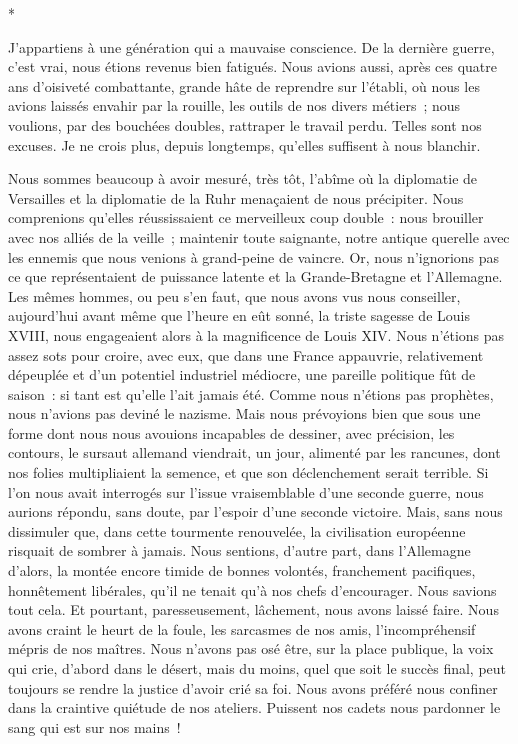\documentclass[french,twoside]{book} %
\begin{document}
\begin{center}
*\end{center}
\noindent J’appartiens à une génération qui a mauvaise conscience. De la dernière guerre, c’est vrai, nous étions revenus bien fatigués. Nous avions aussi, après ces quatre ans d’oisiveté combattante, grande hâte de reprendre sur l’établi, où nous les avions laissés envahir par la rouille, les outils de nos divers métiers ; nous voulions, par des bouchées doubles, rattraper le travail perdu. Telles sont nos excuses. Je ne crois plus, depuis longtemps, qu’elles suffisent à nous blanchir.\par
Nous sommes beaucoup à avoir mesuré, très tôt, l’abîme où la diplomatie de Versailles et la diplomatie de la Ruhr menaçaient de nous précipiter. Nous comprenions qu’elles réussissaient ce merveilleux coup double : nous brouiller avec nos alliés de la veille ; maintenir toute saignante, notre antique querelle avec les ennemis que nous venions à grand-peine de vaincre. Or, nous n’ignorions pas ce que représentaient de puissance latente et la Grande-Bretagne et l’Allemagne. Les mêmes hommes, ou peu s’en faut, que nous avons vus nous conseiller, aujourd’hui avant même que l’heure en eût sonné, la triste sagesse de Louis XVIII, nous engageaient alors à la magnificence de Louis XIV. Nous n’étions pas assez sots pour croire, avec eux, que dans une France appauvrie, relativement dépeuplée et d’un potentiel industriel médiocre, une pareille politique fût de saison : si tant est qu’elle l’ait jamais été. Comme nous n’étions pas prophètes, nous n’avions pas deviné le nazisme. Mais nous prévoyions bien que sous une forme dont nous nous avouions incapables de dessiner, avec précision, les contours, le sursaut allemand viendrait, un jour, alimenté par les   rancunes, dont nos folies multipliaient la semence, et que son déclenchement serait terrible. Si l’on nous avait interrogés sur l’issue vraisemblable d’une seconde guerre, nous aurions répondu, sans doute, par l’espoir d’une seconde victoire. Mais, sans nous dissimuler que, dans cette tourmente renouvelée, la civilisation européenne risquait de sombrer à jamais. Nous sentions, d’autre part, dans l’Allemagne d’alors, la montée encore timide de bonnes volontés, franchement pacifiques, honnêtement libérales, qu’il ne tenait qu’à nos chefs d’encourager. Nous savions tout cela. Et pourtant, paresseusement, lâchement, nous avons laissé faire. Nous avons craint le heurt de la foule, les sarcasmes de nos amis, l’incompréhensif mépris de nos maîtres. Nous n’avons pas osé être, sur la place publique, la voix qui crie, d’abord dans le désert, mais du moins, quel que soit le succès final, peut toujours se rendre la justice d’avoir crié sa foi. Nous avons préféré nous confiner dans la craintive quiétude de nos ateliers. Puissent nos cadets nous pardonner le sang qui est sur nos mains !\par
\end{document}
